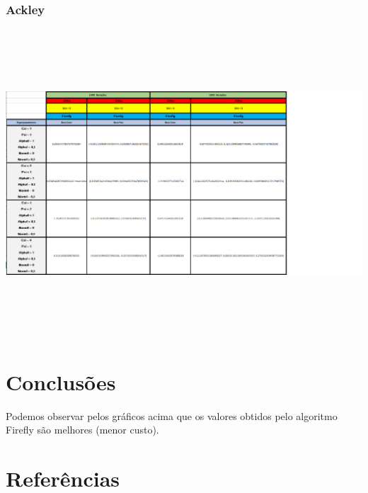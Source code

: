\documentclass[10pt]{article}
\begin{document}
\subsubsection{Ackley}\label{sec:comp-PSO}
  \includegraphics[height=11.5cm]{img/Fireflyackley.png}

\section{Conclusões}\label{sec:an-da-info-fin-da-org}
  Podemos observar pelos gráficos acima que os valores obtidos pelo algoritmo Firefly são melhores (menor custo).

\vspace{1cm}

\section{Referências}\label{sec:sup-inf-utl}






\pagebreak
\end{document}
